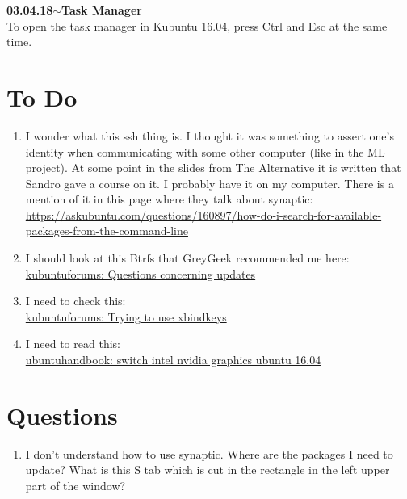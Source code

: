 \documentclass[11pt,a4paper]{article}
\newenvironment{loggentry}[2]%
{\noindent\textbf{#1}\hspace{1cm}$\mathbf{\sim}$\text{ }\textbf{#2}\\}{\vspace{0.5cm}}
\begin{document}
\begin{loggentry}{03.04.18}{Task Manager}
To open the task manager in Kubuntu 16.04, press Ctrl and Esc at the same time.
\end{loggentry}


\section{To Do}
\begin{enumerate}
\item I wonder what this ssh thing is. I thought it was something to assert one's identity when communicating with some other computer (like in the ML project). At some point in the slides from The Alternative it is written that Sandro gave a course on it. I probably have it on my computer. There is a mention of it in this page where they talk about synaptic:\\
\url{https://askubuntu.com/questions/160897/how-do-i-search-for-available-packages-from-the-command-line}
\item I should look at this Btrfs that GreyGeek recommended me here:\\
\href{https://www.kubuntuforums.net/showthread.php/72837-Questions-concerning-updates?p=408673#post408673}{kubuntuforums: Questions concerning updates}
\item I need to check this:\\
\href{https://www.kubuntuforums.net/showthread.php/72847-Trying-to-use-xbindkeys?p=408761#post408761}{kubuntuforums: Trying to use xbindkeys}
\item I need to read this:\\
\href{http://ubuntuhandbook.org/index.php/2016/04/switch-intel-nvidia-graphics-ubuntu-16-04/}{ubuntuhandbook: switch intel nvidia graphics ubuntu 16.04}
\end{enumerate}

\section{Questions}
\begin{enumerate}
\item I don't understand how to use synaptic. Where are the packages I need to update? What is this S tab which is cut in the rectangle in the left upper part of the window?
\end{enumerate}
\end{document}
